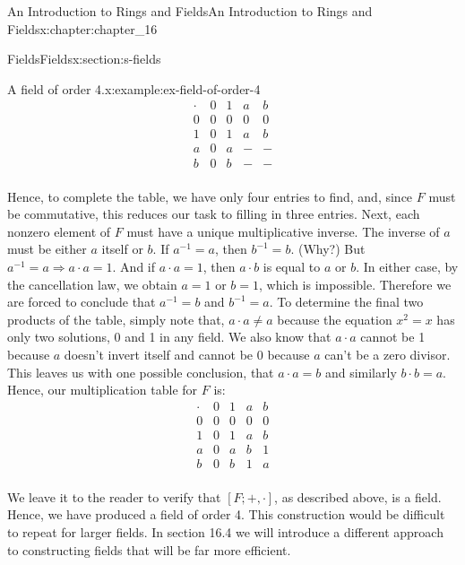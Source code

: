 \documentclass[twoside,10pt,]{book}
\numberwithin{equation}{section}
\begin{document}
\begin{chapterptx}{An Introduction to Rings and Fields}{}{An Introduction to Rings and Fields}{}{}{x:chapter:chapter_16}
\begin{sectionptx}{Fields}{}{Fields}{}{}{x:section:s-fields}
\begin{example}{A field of order 4.}{x:example:ex-field-of-order-4}
\begin{equation*}
\begin{array}{c|cccc}
\cdot & 0 & 1 & a & b \\
\hline
0 & 0 & 0 & 0 & 0 \\
1 & 0 & 1 & a & b \\
a & 0 & a & - & - \\
b & 0 & b & - & - \\
\end{array}
\end{equation*}
%
\par
Hence, to complete the table, we have only four entries to find, and, since \(F\) must be commutative, this reduces our task to filling in three entries. Next, each nonzero element of \(F\) must have a unique multiplicative inverse. The inverse of \(a\) must be either \(a\) itself or \(b\). If \(a^{-1} = a\), then \(b^{-1}=b\). (Why?) But  \(a^{-1} = a \Rightarrow  a \cdot  a = 1\). And if \(a \cdot  a = 1\), then \(a \cdot  b\) is equal to \(a\) or \(b\).  In either case, by the cancellation law, we obtain \(a = 1\) or \(b = 1\), which is impossible. Therefore we are forced to conclude that \(a^{-1} = b\) and \(b^{-1} = a\). To determine the final two products of the table, simply note that, \(a \cdot  a \neq  a\) because the equation \(x^2=x\) has only two solutions, 0 and 1 in any field. We also know that \(a\cdot a\) cannot be 1 because \(a\) doesn't invert itself and cannot be 0 because \(a\) can't be a zero divisor. This leaves us with one possible conclusion, that  \(a \cdot  a = b\) and similarly \(b \cdot  b = a\).  Hence, our multiplication table for \(F\) is:%
\begin{equation*}
\begin{array}{c|cccc}
\cdot & 0 & 1 & a & b \\
\hline
0 & 0 & 0 & 0 & 0 \\
1 & 0 & 1 & a & b \\
a & 0 & a & b & 1 \\
b & 0 & b & 1 & a \\
\end{array}
\end{equation*}
%
\par
We leave it to the reader to verify that \([F; +, \cdot ]\), as described above, is a field. Hence, we have produced a field of order 4. This construction would be difficult to repeat for larger fields.  In section 16.4 we will introduce a different approach to constructing fields that will be far more efficient.%
\end{example}

\end{sectionptx}
\end{chapterptx}
\end{document}
